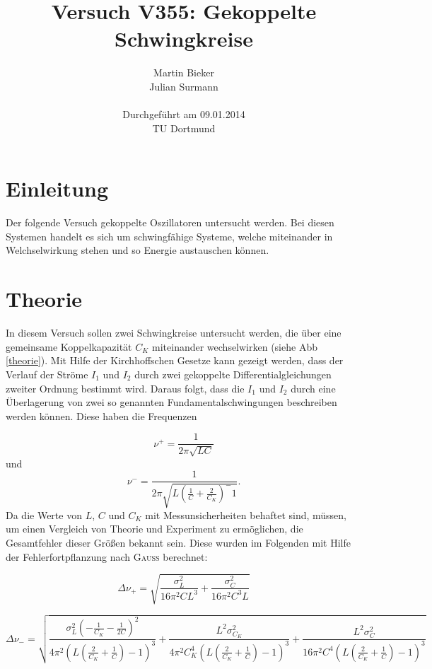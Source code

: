 \documentclass[11pt,ngerman,a4paper]{article}
\title{\textbf{Versuch V355: Gekoppelte Schwingkreise}}
\author{Martin Bieker\\
		Julian Surmann\\
		\\
		Durchgef\"{u}hrt am 09.01.2014\\
		TU Dortmund}
\date{}
\begin{document}
\renewcommand\tablename{Tabelle}
\renewcommand\figurename{Abbildung}
\maketitle
\thispagestyle{empty}
\newpage
\clearpage
\setcounter{page}{1}


\section{Einleitung}
Der folgende Versuch gekoppelte Oszillatoren untersucht werden. Bei diesen Systemen handelt es sich um schwingfähige Systeme, welche miteinander in Welchselwirkung stehen und so Energie austauschen können. 

\section{Theorie}

In diesem Versuch sollen zwei Schwingkreise untersucht werden, die über eine gemeinsame Koppelkapazität $C_K$ miteinander wechselwirken (siehe Abb \ref{theorie}). Mit Hilfe der Kirchhoffschen Gesetze kann gezeigt werden, dass der Verlauf der Ströme $I_1$ und $I_2$ durch zwei gekoppelte Differentialgleichungen zweiter Ordnung bestimmt wird. Daraus folgt, dass die $I_1$ und $I_2$ durch eine Überlagerung von zwei so genannten Fundamentalschwingungen beschreiben werden können. Diese haben die Frequenzen

\begin{equation}
\nu^+ = \frac{1}{2 \pi \sqrt{LC}}
\label{nueplus}
\end{equation}
und 
\begin{equation}
\nu^- =\frac1{2\pi\sqrt{L(\frac1C + \frac2{C_K})^-1}}.
\label{nueminus}
\end{equation}
Da die Werte von $L$, $C$ und $C_K$ mit Messunsicherheiten behaftet sind, müssen, um einen Vergleich von Theorie und Experiment zu ermöglichen, die Gesamtfehler dieser Größen bekannt sein. Diese wurden im Folgenden mit Hilfe der Fehlerfortpflanzung nach \textsc{Gauss} berechnet:

\begin{equation}
\Delta \nu_+ = \sqrt{\frac{\sigma_{L}^{2}}{16 \pi^{2} C L^{3}} + \frac{\sigma_{C}^{2}}{16 \pi^{2} C^{3} L}}
\end{equation}

\begin{equation}
\Delta \nu_- = \sqrt{\frac{\sigma_{L}^{2} \left(- \frac{1}{C_{K}} - \frac{1}{2 C}\right)^{2}}{4 \pi^{2} \left(L \left(\frac{2}{C_{K}} + \frac{1}{C}\right) - 1\right)^{3}} + \frac{L^{2} \sigma_{C_{K}}^{2}}{4 \pi^{2} C_{K}^{4} \left(L \left(\frac{2}{C_{K}} + \frac{1}{C}\right) - 1\right)^{3}} + \frac{L^{2} \sigma_{C}^{2}}{16 \pi^{2} C^{4} \left(L \left(\frac{2}{C_{K}} + \frac{1}{C}\right) - 1\right)^{3}}}
\end{equation}
\end{document}
